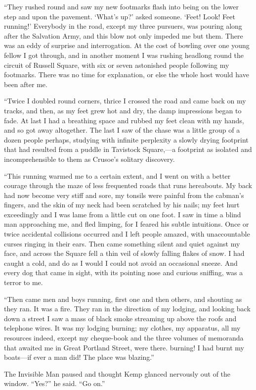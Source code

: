 “They rushed round and saw my new footmarks flash into being on the lower step and upon the pavement. ‘What’s up?’ asked someone. ‘Feet! Look! Feet running!’ Everybody in the road, except my three pursuers, was pouring along after the Salvation Army, and this blow not only impeded me but them. There was an eddy of surprise and interrogation. At the cost of bowling over one young fellow I got through, and in another moment I was rushing headlong round the circuit of Russell Square, with six or seven astonished people following my footmarks. There was no time for explanation, or else the whole host would have been after me.

“Twice I doubled round corners, thrice I crossed the road and came back on my tracks, and then, as my feet grew hot and dry, the damp impressions began to fade. At last I had a breathing space and rubbed my feet clean with my hands, and so got away altogether. The last I saw of the chase was a little group of a dozen people perhaps, studying with infinite perplexity a slowly drying footprint that had resulted from a puddle in Tavistock Square,—a footprint as isolated and incomprehensible to them as Crusoe’s solitary discovery.

“This running warmed me to a certain extent, and I went on with a better courage through the maze of less frequented roads that runs hereabouts. My back had now become very stiff and sore, my tonsils were painful from the cabman’s fingers, and the skin of my neck had been scratched by his nails; my feet hurt exceedingly and I was lame from a little cut on one foot. I saw in time a blind man approaching me, and fled limping, for I feared his subtle intuitions. Once or twice accidental collisions occurred and I left people amazed, with unaccountable curses ringing in their ears. Then came something silent and quiet against my face, and across the Square fell a thin veil of slowly falling flakes of snow. I had caught a cold, and do as I would I could not avoid an occasional sneeze. And every dog that came in sight, with its pointing nose and curious sniffing, was a terror to me.

“Then came men and boys running, first one and then others, and shouting as they ran. It was a fire. They ran in the direction of my lodging, and looking back down a street I saw a mass of black smoke streaming up above the roofs and telephone wires. It was my lodging burning; my clothes, my apparatus, all my resources indeed, except my cheque-book and the three volumes of memoranda that awaited me in Great Portland Street, were there. burning! I had burnt my boats—if ever a man did! The place was blazing.”

The Invisible Man paused and thought Kemp glanced nervously out of the window. “Yes?” he said. “Go on.”